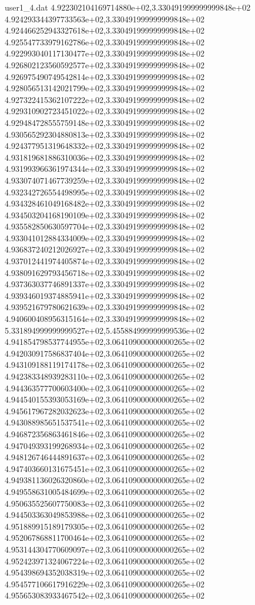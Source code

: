 \begin{filecontents}{user1_4.dat}
4.922302104169714880e+02,3.330491999999999848e+02
4.924293344397733563e+02,3.330491999999999848e+02
4.924466252943327618e+02,3.330491999999999848e+02
4.925547733979162786e+02,3.330491999999999848e+02
4.922993040117130477e+02,3.330491999999999848e+02
4.926802123560592577e+02,3.330491999999999848e+02
4.926975490749542814e+02,3.330491999999999848e+02
4.928056513142021799e+02,3.330491999999999848e+02
4.927322415362107222e+02,3.330491999999999848e+02
4.929310902723451022e+02,3.330491999999999848e+02
4.929484728555759148e+02,3.330491999999999848e+02
4.930565292304880813e+02,3.330491999999999848e+02
4.924377951319648332e+02,3.330491999999999848e+02
4.931819681886310036e+02,3.330491999999999848e+02
4.931993966361974344e+02,3.330491999999999848e+02
4.933074071467739259e+02,3.330491999999999848e+02
4.932342726554498995e+02,3.330491999999999848e+02
4.934328461049168482e+02,3.330491999999999848e+02
4.934503204168190109e+02,3.330491999999999848e+02
4.935582850630597704e+02,3.330491999999999848e+02
4.933041012884334009e+02,3.330491999999999848e+02
4.936837240212026927e+02,3.330491999999999848e+02
4.937012441974405874e+02,3.330491999999999848e+02
4.938091629793456718e+02,3.330491999999999848e+02
4.937363037746891337e+02,3.330491999999999848e+02
4.939346019374885941e+02,3.330491999999999848e+02
4.939521679780621639e+02,3.330491999999999848e+02
4.940600408956315164e+02,3.330491999999999848e+02
5.331894999999999527e+02,5.455884999999999536e+02
4.941854798537744955e+02,3.064109000000000265e+02
4.942030917586837404e+02,3.064109000000000265e+02
4.943109188119174178e+02,3.064109000000000265e+02
4.942383348939283110e+02,3.064109000000000265e+02
4.944363577700603400e+02,3.064109000000000265e+02
4.944540155393053169e+02,3.064109000000000265e+02
4.945617967282032623e+02,3.064109000000000265e+02
4.943088985651537541e+02,3.064109000000000265e+02
4.946872356863461846e+02,3.064109000000000265e+02
4.947049393199268934e+02,3.064109000000000265e+02
4.948126746444891637e+02,3.064109000000000265e+02
4.947403660131675451e+02,3.064109000000000265e+02
4.949381136026320860e+02,3.064109000000000265e+02
4.949558631005484699e+02,3.064109000000000265e+02
4.950635525607750083e+02,3.064109000000000265e+02
4.944503363049853988e+02,3.064109000000000265e+02
4.951889915189179305e+02,3.064109000000000265e+02
4.952067868811700464e+02,3.064109000000000265e+02
4.953144304770609097e+02,3.064109000000000265e+02
4.952423971324067224e+02,3.064109000000000265e+02
4.954398694352038319e+02,3.064109000000000265e+02
4.954577106617916229e+02,3.064109000000000265e+02
4.955653083933467542e+02,3.064109000000000265e+02

\end{filecontents}

